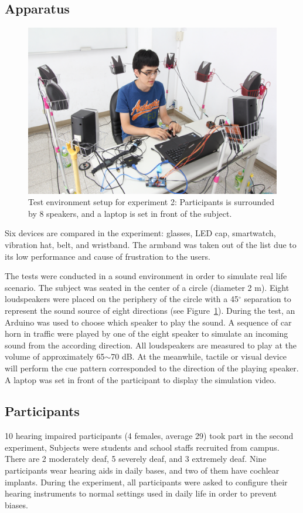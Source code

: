 \documentclass{sigchi}
\begin{document}
\subsection{Apparatus}

\begin{figure}[!t]
\centering
\includegraphics[width=0.9\columnwidth]{Speakers}
\caption{Test environment setup for experiment 2: Participants is surrounded by 8 speakers, and a laptop is set in front of the subject.}
\label{fig:speakers}
\end{figure}
Six devices are compared in the experiment: glasses, LED cap, smartwatch, vibration hat, belt, and wristband. The armband was taken out of the list due to its low performance and cause of frustration to the users.

The tests were conducted in a sound environment in order to simulate real life scenario. The subject was seated in the center of a circle (diameter 2 m). Eight loudspeakers were placed on the periphery of the circle with a 45$^\circ$ separation to represent the sound source of eight directions (see Figure~\ref{fig:speakers}). During the test, an Arduino was used to choose which speaker to play the sound. A sequence of car horn in traffic were played by one of the eight speaker to simulate an incoming sound from the according direction. All loudspeakers are measured to play at the volume of approximately 65$\sim$70 dB. At the meanwhile, tactile or visual device will perform the cue pattern corresponded to the direction of the playing speaker. A laptop was set in front of the participant to display the simulation video.

\subsection{Participants}
10 hearing impaired participants (4 females, average 29) took part in the second experiment, Subjects were students and school staffs recruited from campus. There are 2 moderately deaf, 5 severely deaf, and 3 extremely deaf. Nine participants wear hearing aids in daily bases, and two of them have cochlear implants. During the experiment, all participants were asked to configure their hearing instruments to normal settings used in daily life in order to prevent biases.
\end{document}
